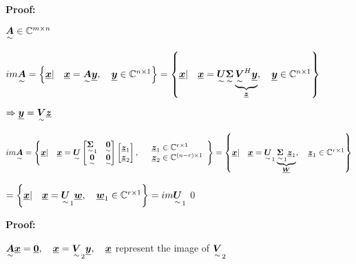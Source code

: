 


\textbf{Proof: } 

$\ma{A}\in\mathbb{C}^{m\times n}$

$im\ma{A}=\left\lbrace \vec{x} |\quad \vec{x}=\ma{A}\vec{y} ,\quad\vec{y}\in\mathbb{C}^{n\times 1}  \right\rbrace
=\left\lbrace \vec{x} |\quad \vec{x}=\ma{U}\ma{\Sigma}\underbrace{\ma{V}^H\vec{y}}_{\vec{z}} ,\quad\vec{y}\in\mathbb{C}^{n\times 1}  \right\rbrace$

$\Rightarrow\vec{y}=\ma{V}\vec{z}$

$im\ma{A}=\left\lbrace \vec{x} |\quad \vec{x}=\ma{U}\mat{\ma{\Sigma}_1&\ma{0}\\\ma{0}&\ma{0}}\mat{\vec{z}_1\\\vec{z}_2} ,
\quad \begin{array}{l}\vec{z}_1 \in\mathbb{C}^{r\times 1}\\\vec{z}_2 \in\mathbb{C}^{(n-r)\times 1}\end{array} \right\rbrace
=\left\lbrace \vec{x} |\quad \vec{x}=\ma{U}_1\underbrace{\ma{\Sigma}_1\vec{z}_1}_{\vec{W}} ,
\quad \vec{z}_1 \in\mathbb{C}^{r\times 1}\right\rbrace$

$=\left\lbrace \vec{x} |\quad \vec{x}=\ma{U}_1\vec{w} ,
\quad \vec{w}_1 \in\mathbb{C}^{r\times 1}\right\rbrace=im\ma{U}_1$\qed






\textbf{Proof: } 

$\ma{A}\vec{x}=\vec{0}, \quad \vec{x}=\ma{V}_2\vec{y}, \quad \vec{x}$ represent the image of $\ma{V}_2$

